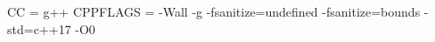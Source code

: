 \begin{code}
CC = g++
CPPFLAGS = -Wall -g -fsanitize=undefined -fsanitize=bounds -std=c++17 -O0
\end{code}